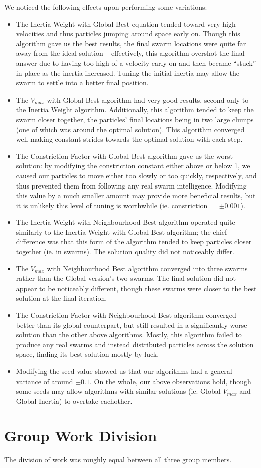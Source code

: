 \documentclass[12pt]{article}
\begin{document}


We noticed the following effects upon performing some variations:
\begin{itemize}
\item The Inertia Weight with Global Best equation tended toward very high velocities and thus particles jumping around space early on. Though this algorithm gave us the best results, the final swarm locations were quite far away from the ideal solution -- effectively, this algorithm overshot the final answer due to having too high of a velocity early on and then became ``stuck'' in place as the inertia increased. Tuning the initial inertia may allow the swarm to settle into a better final position.
\item The $V_{max}$ with Global Best algorithm had very good results, second only to the Inertia Weight algorithm. Additionally, this algorithm tended to keep the swarm closer together, the particles' final locations being in two large clumps (one of which was around the optimal solution). This algorithm converged well making constant strides towards the optimal solution with each step.
\item The Constriction Factor with Global Best algorithm gave us the worst solution: by modifying the constriction constant either above or below 1, we caused our particles to move either too slowly or too quickly, respectively, and thus prevented them from following any real swarm intelligence. Modifying this value by a much smaller amount may provide more beneficial results, but it is unlikely this level of tuning is worthwhile (ie. constriction $= \pm 0.001$).
\item The Inertia Weight with Neighbourhood Best algorithm operated quite similarly to the Inertia Weight with Global Best algorithm; the chief difference was that this form of the algorithm tended to keep particles closer together (ie. in swarms). The solution quality did not noticeably differ.
\item The $V_{max}$ with Neighbourhood Best algorithm converged into three swarms rather than the Global version's two swarms. The final solution did not appear to be noticeably different, though these swarms were closer to the best solution at the final iteration.
\item The Constriction Factor with Neighbourhood Best algorithm converged better than its global counterpart, but still resulted in a significantly worse solution than the other above algorithms. Mostly, this algorithm failed to produce any real swarms and instead distributed particles across the solution space, finding its best solution mostly by luck.
\item Modifying the seed value showed us that our algorithms had a general variance of around $\pm 0.1$. On the whole, our above observations hold, though some seeds may allow algorithms with similar solutions (ie. Global $V_{max}$ and Global Inertia) to overtake eachother.
\end{itemize}

\section*{Group Work Division}
The division of work was roughly equal between all three group members.
\end{document}
